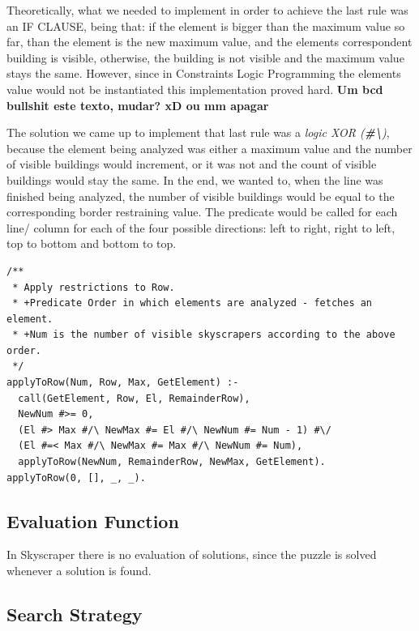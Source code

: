 \documentclass{llncs}
\begin{document}
Theoretically, what we needed to implement in order to achieve the last rule was an IF CLAUSE, being that: if the element is bigger than the maximum value so far, than the element is the new maximum value, and the elements correspondent building is visible, otherwise, the building is not visible and the maximum value stays the same. However, since in Constraints  Logic Programming the elements value would not be instantiated this implementation proved hard. \textbf{Um bcd bullshit este texto, mudar? xD ou mm apagar}

The solution we came up to implement that last rule was a \textit{logic XOR (\textbf{\#\textbackslash})}, because the element being analyzed was either a maximum value and the number of visible buildings would increment, or it was not and the count of visible buildings would stay the same. In the end, we wanted to, when the line was finished being analyzed, the number of visible buildings would be equal to the corresponding border restraining value. The predicate would be called for each line/ column for each of the four possible directions: left to right, right to left, top to bottom and bottom to top. 

\begin{lstlisting}[frame=tblr, caption=Constraint that assures correct number of visible buildings ]	
/**
 * Apply restrictions to Row.
 * +Predicate Order in which elements are analyzed - fetches an element.
 * +Num is the number of visible skyscrapers according to the above order.
 */
applyToRow(Num, Row, Max, GetElement) :-
  call(GetElement, Row, El, RemainderRow),
  NewNum #>= 0,
  (El #> Max #/\ NewMax #= El #/\ NewNum #= Num - 1) #\/
  (El #=< Max #/\ NewMax #= Max #/\ NewNum #= Num),
  applyToRow(NewNum, RemainderRow, NewMax, GetElement).
applyToRow(0, [], _, _).
\end{lstlisting}

%
\subsection{Evaluation Function}

In Skyscraper there is no evaluation of solutions, since the puzzle is solved whenever a solution is found.

%
\subsection{Search Strategy}
\end{document}
